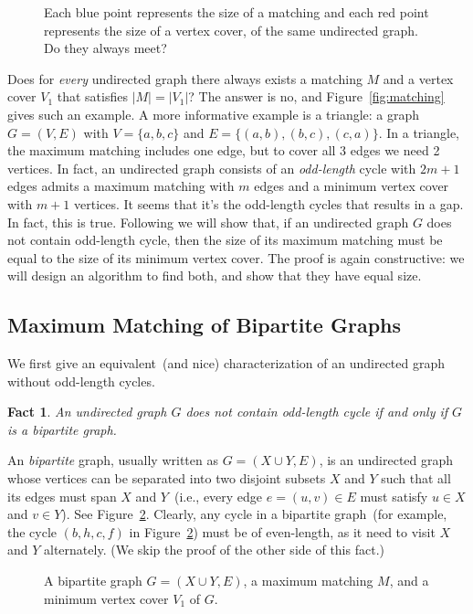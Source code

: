 \documentclass[letterpaper,11pt]{article}
\theoremstyle{mytheorem}
\newtheorem{fact}{Fact}
\begin{document}
\begin{figure}[h]
\centering{}
\caption{Each blue point represents the size of a matching and each red point represents the size of a vertex cover,
of the same undirected graph. Do they always meet?}
\label{fig:meet}
\end{figure}

Does for \emph{every} undirected graph there always exists a matching $M$ and a 
vertex cover $V_1$ that satisfies $|M| = |V_1|$?
The answer is no, and Figure~\ref{fig:matching} gives such an example.
A more informative example is a triangle: a graph $G = (V, E)$ with $V = \{a,b,c\}$ and $E = \{(a,b), (b,c), (c,a)\}$.
In a triangle, the maximum matching includes one edge, but to cover all 3 edges we need 2 vertices.
In fact, an undirected graph consists of an \emph{odd-length} cycle with $2m+1$ edges admits
a maximum matching with $m$ edges and a minimum vertex cover with $m+1$ vertices.
It seems that it's the odd-length cycles that results in a gap.
In fact, this is true. Following we will show that, if an undirected
graph $G$ does not contain odd-length cycle, then the size of its maximum matching
must be equal to the size of its minimum vertex cover. The proof is again constructive:
we will design an algorithm to find both, and show that they have equal size.


\subsection*{Maximum Matching of Bipartite Graphs}

We first give an equivalent~(and nice) characterization of an undirected graph without odd-length cycles.
\begin{fact}
An undirected graph $G$ does not contain odd-length cycle if and only if $G$ is a \emph{bipartite} graph.
\end{fact}

An \emph{bipartite} graph, usually written as $G = (X\cup Y, E)$, is an undirected graph
whose vertices can be separated into two disjoint subsets $X$ and $Y$ such that all its edges
must span $X$ and $Y$~(i.e., every edge $e = (u,v)\in E$ must satisfy $u\in X$ and $v\in Y$).
See Figure~\ref{fig:bipartite}.
Clearly, any cycle in a bipartite graph~(for example, the cycle $(b,h,c,f)$ in Figure~\ref{fig:bipartite})
must be of even-length, as it need to visit $X$ and $Y$ alternately.
(We skip the proof of the other side of this fact.)

\begin{figure}[h]
\centering{}
\caption{A bipartite graph $G = (X\cup Y, E)$, 
a maximum matching $M$, and a minimum vertex cover $V_1$ of $G$.  }
\label{fig:bipartite}
\end{figure}
\end{document}
